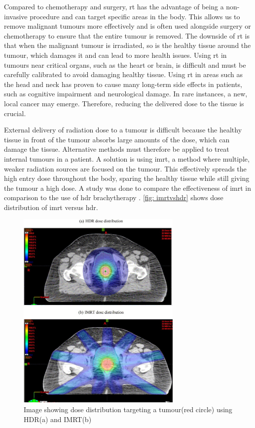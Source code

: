 \documentclass[main.tex]{subfiles}
\begin{document}
 Compared to chemotherapy and surgery, \gls{rt} has the advantage of being a non-invasive procedure and can target specific areas in the body. This allows us to remove malignant tumours more effectively and is often used alongside surgery or chemotherapy to ensure that the entire tumour is removed. The downside of \gls{rt} is that when the malignant tumour is irradiated, so is the healthy tissue around the tumour, which damages it and can lead to more health issues. Using \gls{rt} in tumours near critical organs, such as the heart or brain, is difficult and must be carefully calibrated to avoid damaging healthy tissue. Using \gls{rt} in areas such as the head and neck has proven to cause many long-term side effects in patients, such as cognitive impairment and neurological damage. In rare instances, a new, local cancer may emerge\cite{headRTData}. Therefore, reducing the delivered dose to the tissue is crucial.
 
 External delivery of radiation dose to a tumour is difficult because the healthy tissue in front of the tumour absorbs large amounts of the dose, which can damage the tissue. Alternative methods must therefore be applied to treat internal tumours in a patient. A solution is using \gls{imrt}, a method where multiple, weaker radiation sources are focused on the tumour. This effectively spreads the high entry dose throughout the body, sparing the healthy tissue while still giving the tumour a high dose. A study was done to compare the effectiveness of \gls{imrt} in comparison to the use of \gls{hdr} brachytherapy \cite{imrtVShdr}. \autoref{fig: imrtvshdr} shows dose distribution of \gls{imrt} versus \gls{hdr}.

 \begin{figure}[!htpb]
    \centering
    \includegraphics[width=8cm ]{images/imrt vs hdr.jpg}
    \caption{Image showing dose distribution targeting a tumour(red circle) using HDR(a) and IMRT(b)\cite{imrtVShdr}}
    \label{fig: imrtvshdr}
\end{figure}
\FloatBarrier 
\end{document}
